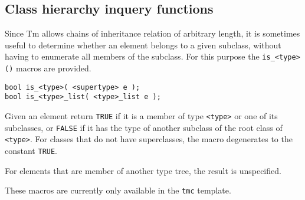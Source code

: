 \subsection{Class hierarchy inquery functions}
Since Tm allows chains of inheritance relation of arbitrary length, it
is sometimes useful to determine whether an element belongs to a given
subclass, without having to enumerate all members of the subclass.
For this purpose the \verb'is_<type>()' macros are provided.
\begin{verbatim}
bool is_<type>( <supertype> e );
bool is_<type>_list( <type>_list e );
\end{verbatim}
\begin{desc}
Given an element return \verb'TRUE' if it is a member of type
\verb'<type>' or one of its subclasses, or \verb'FALSE' if it has
the type of another subclass of the root class of \verb'<type>'.
For classes that do not have superclasses, the macro degenerates to
the constant \verb'TRUE'.
\par
For elements that are member of another type tree, the result is
unspecified.
\par
These macros are currently only available in the \verb'tmc' template.
\end{desc}
